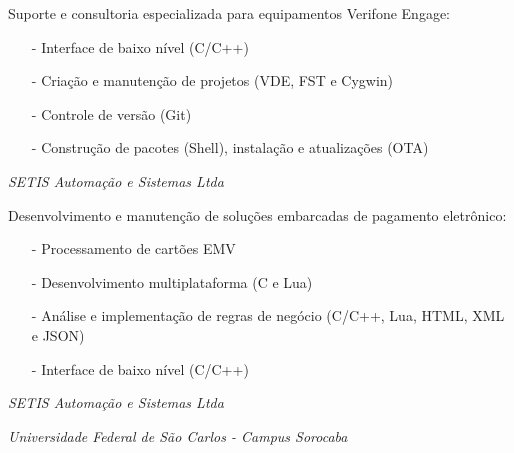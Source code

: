 \documentclass[11pt,a4paper,sans]{moderncv}
\begin{document}
\hspace{1.25cm} \begin{minipage}[htb]{\linewidth - 1.25cm}
    Suporte e consultoria especializada para equipamentos Verifone
    Engage:
    \begin{itemize}
        \item[-] Interface de baixo nível (C/C++)
        \item[-] Criação e manutenção de projetos (VDE, FST e Cygwin)
        \item[-] Controle de versão (Git)
        \item[-] Construção de pacotes (Shell), instalação e atualizações (OTA)
    \end{itemize}
\end{minipage}

\vspace{\baselineskip}

\hspace{1.25cm} \textit{SETIS Automação e Sistemas Ltda}


\hspace{1.25cm} \begin{minipage}[htb]{\linewidth - 1.25cm}
    Desenvolvimento e manutenção de soluções embarcadas de pagamento
    eletrônico:
    \begin{itemize}
        \item[-] Processamento de cartões EMV
        \item[-] Desenvolvimento multiplataforma (C e Lua)
        \item[-] Análise e implementação de regras de negócio (C/C++, Lua,
                 HTML, XML e JSON)
        \item[-] Interface de baixo nível (C/C++)
    \end{itemize}
\end{minipage}

\vspace{\baselineskip}

\hspace{1.25cm} \textit{SETIS Automação e Sistemas Ltda}


\vspace{\baselineskip}

\hspace{1.25cm} \textit{Universidade Federal de São Carlos - Campus Sorocaba}
\end{document}
